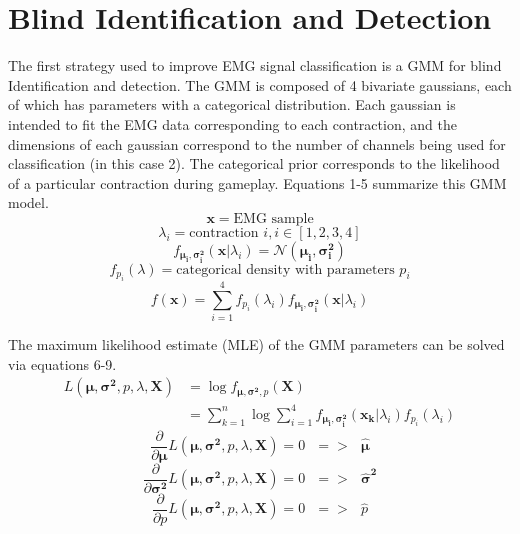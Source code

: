 \documentclass[times, 10pt,twocolumn]{article}
\begin{document}
\section{Blind Identification and Detection}
The first strategy used to improve EMG signal classification is a GMM for blind Identification and detection. The GMM is composed of 4 bivariate gaussians, each of which has parameters with a categorical distribution. Each gaussian is intended to fit the EMG data corresponding to each contraction, and the dimensions of each gaussian correspond to the number of channels being used for classification (in this case 2). The categorical prior corresponds to the likelihood of a particular contraction during gameplay. Equations 1-5 summarize this GMM model.
\begin{equation}
\mathbf{x} = \text{EMG sample}
\end{equation}
\begin{equation}
\lambda_i = \text{contraction }i, i\in[1,2,3,4]
\end{equation}
\begin{equation}
f_{\mathbf{\mu_i},\mathbf{\sigma_i^2}}(\mathbf{x}|\lambda_i) = \mathcal{N}(\mathbf{\mu_i},\mathbf{\sigma_i^2})
\end{equation}
\begin{equation}
f_{p_i}(\lambda) = \text{categorical density with parameters } p_i
\end{equation}
\begin{equation}
f(\mathbf{x}) = \sum_{i=1}^{4}f_{p_i}(\lambda_i)f_{\mathbf{\mu_i},\mathbf{\sigma_i^2}}(\mathbf{x}|\lambda_i)
\end{equation}

The maximum likelihood estimate (MLE) of the GMM parameters can be solved via equations 6-9.
\begin{equation}
\begin{split}
L(\mathbf{\mu},\mathbf{\sigma^2}, p, \lambda, \mathbf{X}) & = \log{f_{\mathbf{\mu},\mathbf{\sigma^2},p}(\mathbf{X})} \\
& = \sum_{k=1}^{n}\log{\sum_{i=1}^{4}f_{\mathbf{\mu_i},\mathbf{\sigma_i^2}}(\mathbf{x_k}|\lambda_i)f_{p_i}(\lambda_i)}
\end{split}
\end{equation}
\begin{equation}
\frac{\partial}{\partial{\mathbf{\mu}}}L(\mathbf{\mu},\mathbf{\sigma^2}, p, \lambda, \mathbf{X}) = 0 \text{ } => \text{ } \mathbf{\hat{\mu}}
\end{equation}
\begin{equation}
\frac{\partial}{\partial{\mathbf{\sigma^2}}}L(\mathbf{\mu},\mathbf{\sigma^2}, p, \lambda, \mathbf{X}) = 0 \text{ } => \text{ } \mathbf{\hat{\sigma}^2}
\end{equation}
\begin{equation}
\frac{\partial}{\partial{p}}L(\mathbf{\mu},\mathbf{\sigma^2}, p, \lambda, \mathbf{X}) = 0 \text{ } => \text{ } \hat{p}
\end{equation}
\end{document}
